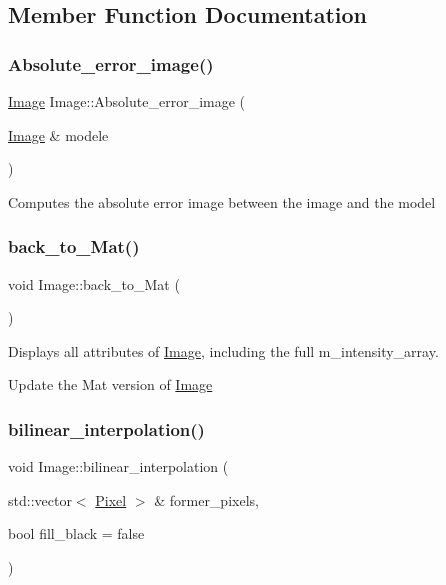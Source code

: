 \subsection{Member Function Documentation}
\mbox{\label{class_image_aefdd49d01f47aeb93d507631adf4eacd}} 
\subsubsection{\texorpdfstring{Absolute\+\_\+error\+\_\+image()}{Absolute\_error\_image()}}
{\footnotesize\ttfamily \hyperlink{class_image}{Image} Image\+::\+Absolute\+\_\+error\+\_\+image (\begin{DoxyParamCaption}\item[{\hyperlink{class_image}{Image} \&}]{modele }\end{DoxyParamCaption})}

Computes the absolute error image between the image and the model \mbox{\label{class_image_a6a8a05862fa0157c8602fd760b347920}} 
\subsubsection{\texorpdfstring{back\+\_\+to\+\_\+\+Mat()}{back\_to\_Mat()}}
{\footnotesize\ttfamily void Image\+::back\+\_\+to\+\_\+\+Mat (\begin{DoxyParamCaption}{ }\end{DoxyParamCaption})}



Displays all attributes of \hyperlink{class_image}{Image}, including the full m\+\_\+intensity\+\_\+array. 

Update the Mat version of \hyperlink{class_image}{Image} \mbox{\label{class_image_a80b8db5c7a26eda57496f2cf53c54b5f}} 
\subsubsection{\texorpdfstring{bilinear\+\_\+interpolation()}{bilinear\_interpolation()}}
{\footnotesize\ttfamily void Image\+::bilinear\+\_\+interpolation (\begin{DoxyParamCaption}\item[{std\+::vector$<$ \hyperlink{class_pixel}{Pixel} $>$ \&}]{former\+\_\+pixels,  }\item[{bool}]{fill\+\_\+black = {\ttfamily false} }\end{DoxyParamCaption})}



